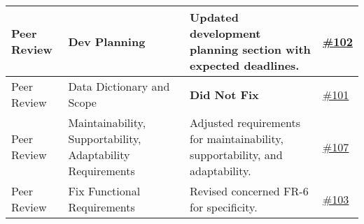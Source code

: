 \documentclass{article}
\begin{document}
\begin{longtable}{| p{} | p{} | p{} | p{} |}
    \hline
    Peer Review & Dev Planning & Updated development planning section with expected deadlines. & \href{https://github.com/TPGEngine/tpg/issues/102}{\#102} \\
    \hline
    Peer Review & Data Dictionary and Scope & \textbf{Did Not Fix} & \href{https://github.com/TPGEngine/tpg/issues/101}{\#101} \\
    \hline
    Peer Review & Maintainability, Supportability, Adaptability Requirements & Adjusted requirements for maintainability, supportability, and adaptability. & \href{https://github.com/TPGEngine/tpg/issues/107}{\#107} \\
    \hline
    Peer Review & Fix Functional Requirements & Revised concerned FR-6 for specificity. & \href{https://github.com/TPGEngine/tpg/issues/103}{\#103} \\
    \hline
\end{longtable}
\end{document}
